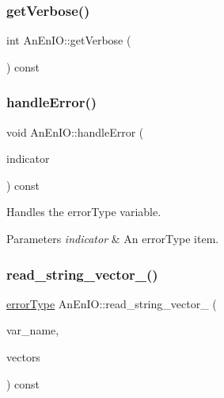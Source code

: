 \subsubsection{\texorpdfstring{get\+Verbose()}{getVerbose()}}
{\footnotesize\ttfamily int An\+En\+I\+O\+::get\+Verbose (\begin{DoxyParamCaption}{ }\end{DoxyParamCaption}) const}

\mbox{\label{class_an_en_i_o_a92276aeba9c0b5bd1cd3d285271d505f}} 
\subsubsection{\texorpdfstring{handle\+Error()}{handleError()}}
{\footnotesize\ttfamily void An\+En\+I\+O\+::handle\+Error (\begin{DoxyParamCaption}\item[{const \mbox{\hyperlink{class_an_en_i_o_aa56bc1ec6610b86db4349bce20f9ead0}{error\+Type}} \&}]{indicator }\end{DoxyParamCaption}) const}

Handles the error\+Type variable.


\begin{DoxyParams}{Parameters}
{\em indicator} & An error\+Type item. \\
\hline
\end{DoxyParams}
\mbox{\label{class_an_en_i_o_a17e7a4c520675c23b01cbd65c7ffe1d5}} 
\subsubsection{\texorpdfstring{read\+\_\+string\+\_\+vector\+\_\+()}{read\_string\_vector\_()}}
{\footnotesize\ttfamily \mbox{\hyperlink{class_an_en_i_o_aa56bc1ec6610b86db4349bce20f9ead0}{error\+Type}} An\+En\+I\+O\+::read\+\_\+string\+\_\+vector\+\_\+ (\begin{DoxyParamCaption}\item[{std\+::string}]{var\+\_\+name,  }\item[{std\+::vector$<$ std\+::string $>$ \&}]{vectors }\end{DoxyParamCaption}) const\hspace{0.3cm}{\ttfamily [protected]}}


